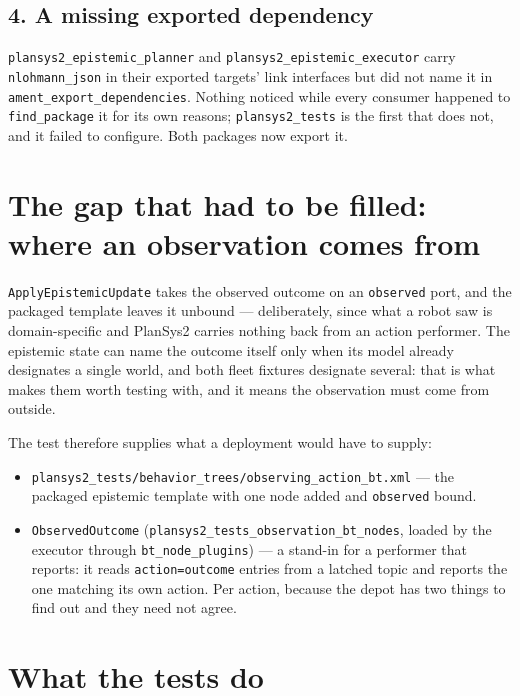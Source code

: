 \documentclass[11pt,a4paper]{article}
\newcommand{\code}[1]{\texttt{\small #1}}
\begin{document}
\subsection*{4. A missing exported dependency}

\code{plansys2\_epistemic\_planner} and \code{plansys2\_epistemic\_executor}
carry \code{nlohmann\_json} in their exported targets' link interfaces but did
not name it in \code{ament\_export\_dependencies}. Nothing noticed while every
consumer happened to \code{find\_package} it for its own reasons;
\code{plansys2\_tests} is the first that does not, and it failed to configure.
Both packages now export it.

\section{The gap that had to be filled: where an observation comes from}

\code{ApplyEpistemicUpdate} takes the observed outcome on an \code{observed}
port, and the packaged template leaves it unbound --- deliberately, since what a
robot saw is domain-specific and PlanSys2 carries nothing back from an action
performer. The epistemic state can name the outcome itself only when its model
already designates a single world, and both fleet fixtures designate several:
that is what makes them worth testing with, and it means the observation must
come from outside.

The test therefore supplies what a deployment would have to supply:

\begin{itemize}
  \item \code{plansys2\_tests/behavior\_trees/observing\_action\_bt.xml} --- the
    packaged epistemic template with one node added and \code{observed} bound.
  \item \code{ObservedOutcome} (\code{plansys2\_tests\_observation\_bt\_nodes},
    loaded by the executor through \code{bt\_node\_plugins}) --- a stand-in for
    a performer that reports: it reads \code{action=outcome} entries from a
    latched topic and reports the one matching its own action. Per action,
    because the depot has two things to find out and they need not agree.
\end{itemize}

\section{What the tests do}
\end{document}
